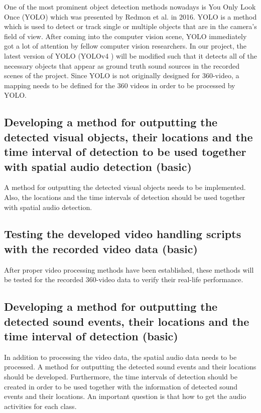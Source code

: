 One of the most prominent object detection methods nowadays is You Only Look Once (YOLO) which was presented by
Redmon et al. \cite{yolo_paper} in 2016. YOLO is a method which is used to detect or track single or multiple
objects that are in the camera's field of view. After coming into the computer vision scene, YOLO immediately got
a lot of attention by fellow computer vision researchers. In our project, the latest version of YOLO (YOLOv4
\cite{yolov4_paper}) will be modified such that it detects all of the necessary objects that appear as ground
truth sound sources in the recorded scenes of the project. Since YOLO is not originally designed for 360-video, a
mapping needs to be defined for the 360 videos in order to be processed by YOLO.

\subsection{Developing a method for outputting the detected visual objects, their locations and the time interval of detection to be used together with spatial audio detection (basic)}

A method for outputting the detected visual objects needs to be implemented. Also, the locations and the time
intervals of detection should be used together with spatial audio detection.

\subsection{Testing the developed video handling scripts with the recorded video data (basic)}

After proper video processing methods have been established, these methods will be tested for the recorded 360-video data to verify their real-life performance.

\subsection{Developing a method for outputting the detected sound events, their locations and the time interval of detection (basic)}

In addition to processing the video data, the spatial audio data needs to be processed. A method for outputting
the detected sound events and their locations should be developed. Furthermore, the time intervals of detection
should be created in order to be used together with the information of detected sound events and their locations.
An important question is that how to get the audio activities for each class.

